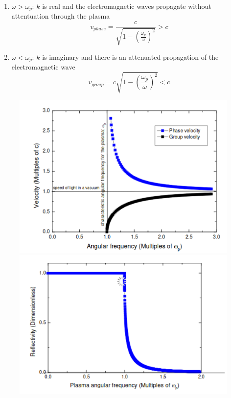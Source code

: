 \documentclass[a4paper, 11pt, normalem]{report}
\begin{document}
\begin{itemize}
\begin{enumerate}
            \item $\omega > \omega_p$: $k$ is real and the electromagnetic waves propagate without attentuation through the plasma
                \begin{equation*}
                    v_{phase} = \frac{c}{\sqrt{1 - \left(\frac{\omega_p}{\omega}\right)^2}} > c
                \end{equation*}
            \item $\omega < \omega_p$: $k$ is imaginary and there is an attenuated propagation of the electromagnetic wave
                \begin{equation*}
                    v_{group} = c\sqrt{1 - \left(\frac{\omega_p}{\omega}\right)^2} < c
                \end{equation*}
        \end{enumerate}
\end{itemize}
\begin{figure}[H]
	\centering
	\includegraphics[scale=0.4]{phasegroup.png}
	\includegraphics[scale=0.4]{plasma.png}
\end{figure}
\end{document}
